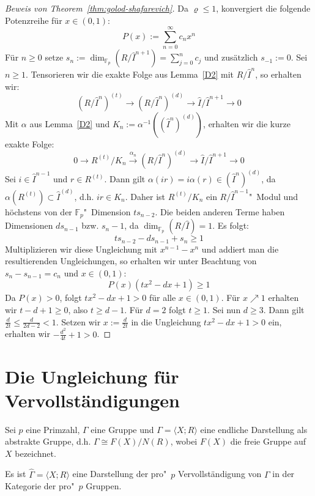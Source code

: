 \documentclass[11pt,a4paper,openany]{memoir}
\begin{document}
\begin{proof}[Beweis von Theorem~\ref{thm:golod-shafarevich}] 
Da $\varrho\leq 1$, konvergiert die folgende Potenzreihe für $x\in (0,1)$:
\[P(x) := \sum_{n=0}^\infty c_nx^n \]
Für $n\geq 0$ setze $s_n:=\dim_{\mathbb{F}_p}(R/\widehat{I}^{n+1})=\sum_{j=0}^nc_j$ und zusätzlich $s_{-1}:=0$. Sei $n\geq 1$. Tensorieren wir die exakte Folge aus Lemma~\ref{D2} mit $R/\widehat{I}^n$, so erhalten wir:
\[ (R/\widehat{I}^n)^{(t)}\to (R/\widehat{I}^n)^{(d)} \to \widehat{I}/\widehat{I}^{n+1} \to 0 \]
Mit $\alpha$ aus Lemma~\ref{D2} und $K_n:=\alpha^{-1}( (\widehat{I}^n)^{(d)})$, erhalten wir die kurze exakte Folge:
\[ 0\to R^{(t)}/K_n \stackrel{\alpha_n}{\to} (R/\widehat{I}^n)^{(d)} \to\widehat{I}/\widehat{I}^{n+1}\to 0 \]
Sei $i\in\widehat{I}^{n-1}$ und $r\in R^{(t)}$. Dann gilt $\alpha(ir)=i\alpha(r)\in(\widehat{I}^n)^{(d)}$, da $\alpha(R^{(t)})\subset\widehat{I}^{(d)}$, d.h. $ir\in K_n$. Daher ist $R^{(t)}/K_n$ ein $R/\widehat{I}^{n-1}$"~Modul und höchstens von der $\mathbb{F}_p$"~Dimension $ts_{n-2}$. Die beiden anderen Terme haben Dimensionen $ds_{n-1}$ bzw. $s_n-1$, da $\dim_{\mathbb{F}_p}(R/\widehat{I})=1$. Es folgt:
\[ts_{n-2}-ds_{n-1}+s_n\geq 1 \]
Multiplizieren wir diese Ungleichung mit $x^{n-1}-x^n$ und addiert man die resultierenden Ungleichungen, so erhalten wir unter Beachtung von $s_n-s_{n-1}=c_n$ und $x\in (0,1)$:
\[ P(x)(tx^2-dx+1)\geq 1 \]
Da $P(x)>0$, folgt $tx^2-dx+1>0$ für alle $x\in (0,1)$. Für $x\nearrow 1$ erhalten wir $t-d+1\geq 0$, also $t\geq d-1$. Für $d=2$ folgt $t\geq 1$. Sei nun $d\geq 3$. Dann gilt $\frac{d}{2t}\leq\frac{d}{2d-2} <1$. Setzen wir $x:=\frac{d}{2t}$ in die Ungleichung $tx^2-dx+1>0$ ein, erhalten wir $-\frac{d^2}{4t}+1>0$.
\end{proof}

\iffalse
\section{Die Ungleichung für Vervollständigungen}

Sei $p$ eine Primzahl, $\Gamma$ eine Gruppe und $\Gamma=\langle X;R\rangle$ eine endliche Darstellung als abstrakte Gruppe, d.h. $\Gamma\cong F(X)/N(R)$, wobei $F(X)$ die freie Gruppe auf $X$ bezeichnet.

\begin{proposition}\label{prop:D4}
Es ist $\widehat{\Gamma}=\langle X;R\rangle$ eine Darstellung der pro"~$p$ Vervollständigung von $\Gamma$ in der Kategorie der pro"~$p$ Gruppen.
\end{proposition}
\end{document}
